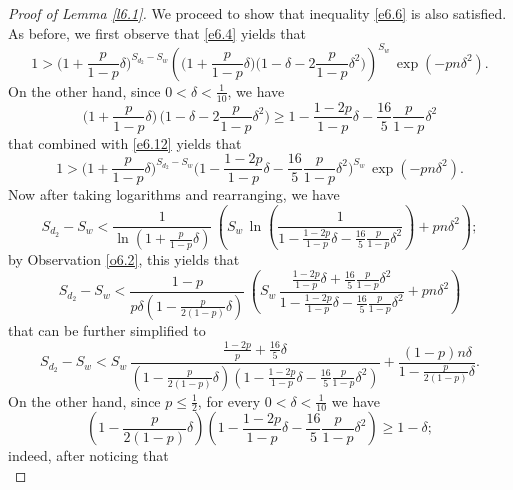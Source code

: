 \documentclass[10pt,a4paper]{amsart}
\theoremstyle{remark}
\newcommand{\meg}{\geqslant}
\newcommand{\mik}{\leqslant}
\begin{document}
\begin{proof}[Proof of Lemma \emph{\ref{l6.1}}]
We proceed to show that inequality \eqref{e6.6} is also satisfied.
As before, we first observe that \eqref{e6.4} yields that
\begin{equation} \label{e6.12}
1 > \Big(1+\frac{p}{1-p}\delta\Big)^{S_{d_2}-S_w}
\left(\big(1+\frac{p}{1-p}\delta\big)\big(1-\delta-2\frac{p}{1-p}\delta^2\big)\right)^{S_w}\, \exp(-pn\delta^2).
\end{equation}
On the other hand, since $0<\delta<\frac{1}{10}$, we have
\begin{equation} \label{e6.13}
\Big(1+\frac{p}{1-p}\delta\Big)\, \Big(1-\delta-2\frac{p}{1-p}\delta^2\Big)\meg
1-\frac{1-2p}{1-p}\delta-\frac{16}{5}\frac{p}{1-p}\delta^2
\end{equation}
that combined with \eqref{e6.12} yields that
\begin{equation} \label{e6.14}
1 > \Big(1+\frac{p}{1-p}\delta\Big)^{S_{d_2}-S_w}
\Big(1-\frac{1-2p}{1-p}\delta-\frac{16}{5}\frac{p}{1-p}\delta^2\Big)^{S_w}\, \exp(-pn\delta^2).
\end{equation}
Now after taking logarithms and rearranging, we have
\begin{equation} \label{e6.15}
S_{d_2}-S_w < \frac{1}{\ln\left(1+\frac{p}{1-p}\delta\right)} \,
\left(S_w\, \ln\left(\frac{1}{1-\frac{1-2p}{1-p}\delta-\frac{16}{5}\frac{p}{1-p}\delta^2}\right)+pn\delta^2\right);
\end{equation}
by Observation \ref{o6.2}, this yields that
\begin{equation} \label{e6.16}
S_{d_2}-S_w < \frac{1-p}{p\delta\left(1-\frac{p}{2(1-p)}\delta\right)} \,
\left(S_w\, \frac{\frac{1-2p}{1-p}\delta+\frac{16}{5}
\frac{p}{1-p}\delta^2}{1-\frac{1-2p}{1-p}\delta-\frac{16}{5}\frac{p}{1-p}\delta^2} + pn\delta^2\right)
\end{equation}
that can be further simplified to
\begin{equation} \label{e6.17}
S_{d_2}-S_w <  S_w\, \frac{\frac{1-2p}{p}+\frac{16}{5}\delta}{\left(1-\frac{p}{2(1-p)}\delta\right)
\left(1-\frac{1-2p}{1-p}\delta-\frac{16}{5}\frac{p}{1-p}\delta^2\right)}+
\frac{(1-p)n\delta}{1-\frac{p}{2(1-p)}\delta}.
\end{equation}
On the other hand, since $p\mik \frac12$, for every $0<\delta<\frac{1}{10}$ we have
\begin{equation} \label{e6.18}
\left(1-\frac{p}{2(1-p)}\delta\right)
\left(1-\frac{1-2p}{1-p}\delta-\frac{16}{5}\frac{p}{1-p}\delta^2\right)\meg 1-\delta;
\end{equation}
indeed, after noticing that
\begin{equation} \label{en.6.2}

\end{equation}
\end{proof}
\end{document}
